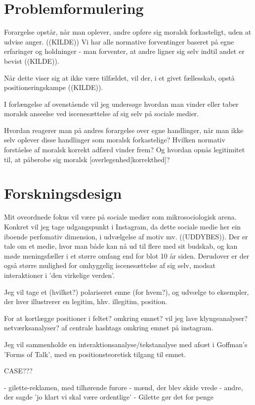 \section{Problemformulering}

Forargelse opstår, når man oplever, andre opføre sig moralsk forkasteligt,
uden at udvise anger. ((KILDE)) Vi har alle normative forventinger
baseret på egne erfaringer og holdninger - man forventer, at andre ligner sig
selv indtil andet er bevist ((KILDE)).

Når dette viser sig at ikke være tilfældet, vil der, i et givet
fællesskab, opstå positioneringskampe ((KILDE)). 

I forlængelse af ovenstående vil jeg undersøge hvordan man vinder eller
taber moralsk anseelse ved iscenesættelse af sig selv på sociale medier.

Hvordan reagerer man på andres forargelse over egne handlinger, når man ikke
selv oplever disse handlinger som moralsk forkastelige? Hvilken normativ forståelse af moralsk
korrekt adfærd vinder frem? Og hvordan opnås legitimitet til, at påberobe
sig moralsk [overlegenhed|korrekthed]?

\section{Forskningsdesign}

Mit oveordnede fokus vil være på sociale medier som mikrosociologisk
arena. Konkret vil jeg tage udgangspunkt i Instagram, da dette sociale
medie her ein iboende perfomativ dimension, i udvælgelse af motiv mv.
((UDDYBES)). Der er tale om et medie, hvor man både kan nå ud til flere med
sit budskab, og kan møde meningsfæller i et større omfang end for blot 10
år siden. Derudover er der også større mulighed for omhyggelig
iscenesættelse af sig selv, modsat interaktioner i 'den virkelige verden'.

Jeg vil tage et (hvilket?) polariseret emne (for hvem?), og udvœlge
to eksempler, der hver illustrerer en legitim, hhv. illegitim, position.

For at kortlægge positioner i feltet? omkring emnet? vil jeg lave klyngeanalyser?
netværksanalyser? af centrale hashtags omkring emnet på instagram.

Jeg vil sammenholde en interaktionsanalyse/tekstanalyse med afsæt i
Goffman's 'Forms of Talk', med en positionsteoretisk tilgang til emnet.

CASE???


- gilette-reklamen, med tilhørende furore
    - mænd, der blev skide vrede
    - andre, der sagde 'jo klart vi skal være ordentlige'
    - Gilette gør det for penge

